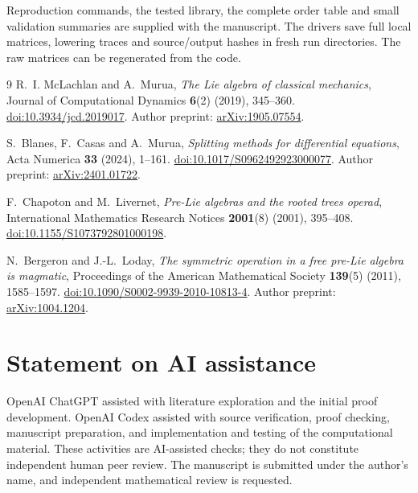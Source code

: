 \documentclass[11pt]{article}
\begin{document}
Reproduction commands, the tested library, the complete order table and
small validation summaries are supplied with the manuscript. The drivers
save full local matrices, lowering traces and source/output hashes in fresh
run directories. The raw matrices can be regenerated from the code.

\begin{thebibliography}{9}
R.~I. McLachlan and A.~Murua,
\emph{The Lie algebra of classical mechanics},
Journal of Computational Dynamics \textbf{6}(2) (2019), 345--360.
\href{https://doi.org/10.3934/jcd.2019017}{doi:10.3934/jcd.2019017}.
Author preprint: \href{https://arxiv.org/abs/1905.07554}{arXiv:1905.07554}.

S.~Blanes, F.~Casas and A.~Murua,
\emph{Splitting methods for differential equations},
Acta Numerica \textbf{33} (2024), 1--161.
\href{https://doi.org/10.1017/S0962492923000077}{doi:10.1017/S0962492923000077}.
Author preprint: \href{https://arxiv.org/abs/2401.01722}{arXiv:2401.01722}.

F.~Chapoton and M.~Livernet,
\emph{Pre-Lie algebras and the rooted trees operad},
International Mathematics Research Notices \textbf{2001}(8) (2001), 395--408.
\href{https://doi.org/10.1155/S1073792801000198}{doi:10.1155/S1073792801000198}.

N.~Bergeron and J.-L.~Loday,
\emph{The symmetric operation in a free pre-Lie algebra is magmatic},
Proceedings of the American Mathematical Society \textbf{139}(5) (2011), 1585--1597.
\href{https://doi.org/10.1090/S0002-9939-2010-10813-4}{doi:10.1090/S0002-9939-2010-10813-4}.
Author preprint: \href{https://arxiv.org/abs/1004.1204}{arXiv:1004.1204}.
\end{thebibliography}

\section*{Statement on AI assistance}
OpenAI ChatGPT assisted with literature exploration and the initial proof
development. OpenAI Codex assisted with source verification, proof checking,
manuscript preparation, and implementation and testing of the computational
material. These activities are AI-assisted checks; they do not constitute
independent human peer review. The manuscript is submitted under the author's
name, and independent mathematical review is requested.
\end{document}
